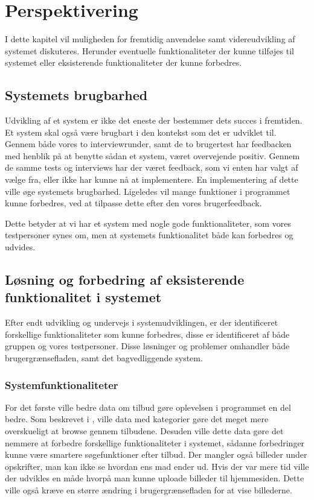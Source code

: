 \chapter{Perspektivering}
I dette kapitel vil muligheden for fremtidig anvendelse samt videreudvikling af systemet diskuteres.
Herunder eventuelle funktionaliteter der kunne tilføjes til systemet eller eksisterende funktionaliteter der kunne forbedres.

\section{Systemets brugbarhed}
Udvikling af et system er ikke det eneste der bestemmer dets succes i fremtiden.
Et system skal også være brugbart i den kontekst som det er udviklet til.
Gennem både vores to interviewrunder, samt de to brugertest har feedbacken med henblik på at benytte sådan et system, været overvejende positiv.
Gennem de samme tests og interviews har der været feedback, som vi enten har valgt af vælge fra, eller ikke har kunne nå at implementere.
En implementering af dette ville øge systemets brugbarhed.
Ligeledes vil mange funktioner i programmet kunne forbedres, ved at tilpasse dette efter den vores brugerfeedback. 

Dette betyder at vi har et system med nogle gode funktionaliteter, som vores testpersoner synes om, men at systemets funktionalitet både kan forbedres og udvides.

\section{Løsning og forbedring af eksisterende funktionalitet i systemet}
Efter endt udvikling og undervejs i systemudviklingen, er der identificeret forskellige funktionaliteter som kunne forbedres, disse er identificeret af både gruppen og vores testpersoner.
Disse løsninger og problemer omhandler både brugergrænsefladen, samt det bagvedliggende system.

\subsection{Systemfunktionaliteter}
For det første ville bedre data om tilbud gøre oplevelsen i programmet en del bedre.
Som beskrevet i , ville data med kategorier gøre det meget mere overskueligt at browse gennem tilbudene.
Desuden ville dette data gøre det nemmere at forbedre forskellige funktionaliteter i systemet, sådanne forbedringer kunne være smartere søgefunktioner efter tilbud.
Der mangler også billeder under opskrifter, man kan ikke se hvordan ens mad ender ud.
Hvis der var mere tid ville der udvikles en måde hvorpå man kunne uploade billeder til hjemmesiden. 
Dette ville også kræve en større ændring i brugergrænsefladen for at vise billederne.

